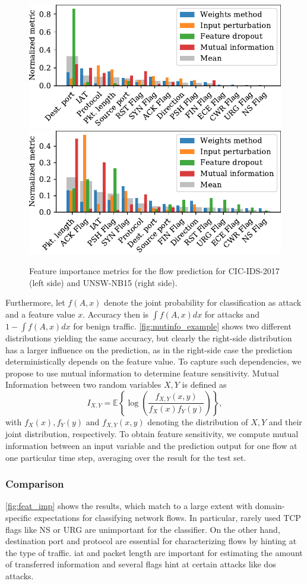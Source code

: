 \documentclass[conference]{IEEEtran}
\newcommand\note[2]{{\color{#1}#2}}
\newcommand\todo[1]{{\note{red}{TODO: #1}}}
\begin{document}
\begin{figure}
\includegraphics[width=.49\textwidth]{../plots/importance/feat_imp_flow_2017.pdf}\hspace{.02\textwidth}
\includegraphics[width=.49\textwidth]{../plots/importance/feat_imp_flow_2015.pdf}
\caption{Feature importance metrics for the flow prediction for CIC-IDS-2017 (left side) and UNSW-NB15 (right side).}
\label{fig:feat_imp}
\end{figure}
Furthermore, let $f(A,x)$  denote the joint probability
for classification as attack and a feature value $x$. Accuracy then is $\int f(A,x) dx$ for attacks and $1-\int f(A,x) dx$ for benign traffic.
\autoref{fig:mutinfo_example} shows two different distributions
yielding the same accuracy, but clearly the right-side distribution has a larger influence on the prediction, as in the right-side case the prediction deterministically depends on the feature value.
To capture such dependencies, we propose to use mutual information %
to determine feature sensitivity.
Mutual Information between two random variables $X,Y$ is defined as
\begin{equation}
I_{X,Y} = \mathbb E \left\{ \log\left(\frac{f_{X,Y}(x,y)}{f_X(x)f_Y(y)}\right) \right\},
\end{equation}
with $f_X(x), f_Y(y)$ and $f_{X,Y}(x,y)$ denoting the distribution of $X,Y$ and their joint distribution, respectively. To obtain feature sensitivity, we compute mutual information between an input variable and the prediction output for one flow at one particular time step, averaging over the result for the test set.

\subsubsection{Comparison}
\autoref{fig:feat_imp} shows the results, which match to a large extent with domain-specific expectations for classifying network flows.
In particular, rarely used TCP flags like NS or URG are unimportant for the classifier. On the other hand, destination port and protocol are essential for characterizing flows by hinting at the type of traffic. \gls{iat} and packet length are important for estimating the amount of transferred information and several flags hint at certain attacks like \gls{dos} attacks.
\end{document}
